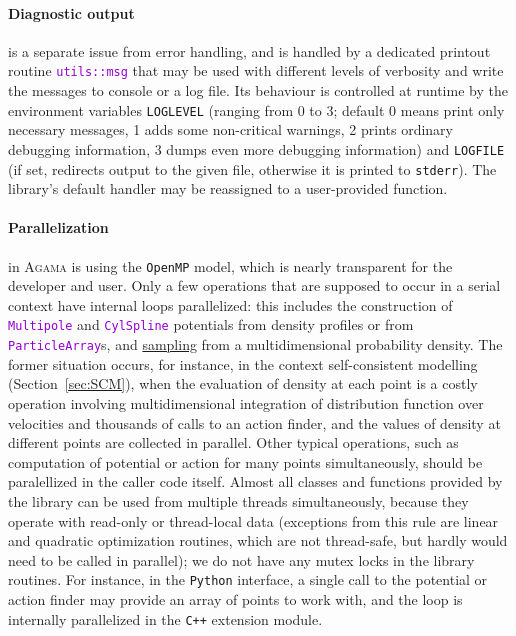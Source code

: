 \documentclass[12pt]{article}
\newcommand{\Agama}{\textsc{Agama}\xspace}
\newcommand{\Cpp}  {\texttt{C++}\xspace}
\newcommand{\Python}{\texttt{Python}\xspace}
\newcommand{\ttt}[1]{\textcolor{darkviolet}{\texttt{#1}}}
\begin{document}
\paragraph{Diagnostic output}  is a separate issue from error handling, and is handled by a dedicated printout routine \ttt{utils::msg} that may be used with different levels of verbosity and write the messages to console or a log file. Its behaviour is controlled at runtime by the environment variables \texttt{LOGLEVEL} (ranging from 0 to 3; default 0 means print only necessary messages, 1 adds some non-critical warnings, 2 prints ordinary debugging information, 3 dumps even more debugging information) and \texttt{LOGFILE} (if set, redirects output to the given file, otherwise it is printed to \texttt{stderr}). The library's default handler may be reassigned to a user-provided function.

\paragraph{Parallelization}  in \Agama is using the \texttt{OpenMP} model, which is nearly transparent for the developer and user. Only a few operations that are supposed to occur in a serial context have internal loops parallelized: this includes the construction of \ttt{Multipole} and \ttt{CylSpline} potentials from density profiles or from \ttt{ParticleArray}s, and \hyperref[sec:Sampling]{sampling} from a multidimensional probability density. The former situation occurs, for instance, in the context self-consistent modelling (Section~\ref{sec:SCM}), when the evaluation of density at each point is a costly operation involving multidimensional integration of distribution function over velocities and thousands of calls to an action finder, and the values of density at different points are collected in parallel.
Other typical operations, such as computation of potential or action for many points simultaneously, should be paralellized in the caller code itself. Almost all classes and functions provided by the library can be used from multiple threads simultaneously, because they operate with read-only or thread-local data (exceptions from this rule are linear and quadratic optimization routines, which are not thread-safe, but hardly would need to be called in parallel); we do not have any mutex locks in the library routines.
For instance, in the \Python interface, a single call to the potential or action finder may provide an array of points to work with, and the loop is internally parallelized in the \Cpp extension module. 
\end{document}
